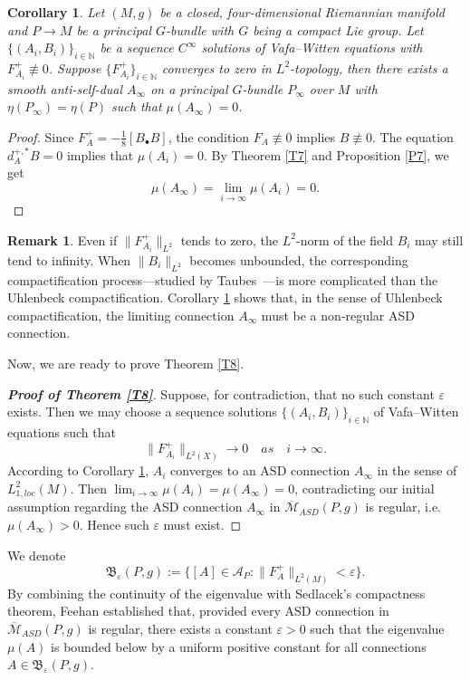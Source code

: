 \documentclass[12pt, twoside]{article}
\newtheorem{corollary}[theorem]{Corollary}
\theoremstyle{definition}
\newtheorem{remark}[theorem]{Remark}
\numberwithin{equation}{section}
\def \N {\mathbb{N}}
\begin{document}
\begin{corollary}\label{C3}
Let $(M,g)$ be a closed, four-dimensional Riemannian manifold and $P\rightarrow M$ be a principal $G$-bundle with $G$ being a compact Lie group. Let $\{(A_{i},B_{i})\}_{i\in\mathbb{N}}$ be a sequence $C^{\infty}$ solutions of Vafa--Witten equations with $F_{A_{i}}^{+}\not\equiv 0$. Suppose  $\{F^{+}_{A_{i}}\}_{i\in\N}$ converges to zero in $L^{2}$-topology, then there exists a smooth anti-self-dual $A_{\infty}$ on a principal $G$-bundle $P_{\infty}$ over $M$ with $\eta(P_{\infty})=\eta(P)$ such that $\mu(A_{\infty})=0$.
\end{corollary}
\begin{proof}
Since $F_{A}^{+}=-\frac{1}{8}[B_{\bullet} B]$, the condition $F_{A}\not\equiv0$ implies $B\not\equiv0$. 
The equation $d_{A}^{+,\ast}B=0$ implies that $\mu(A_{i})=0$. 
By Theorem \ref{T7} and Proposition \ref{P7}, we get $$\mu(A_{\infty})=\lim_{i\rightarrow\infty}\mu(A_{i})=0.$$
\end{proof}
\begin{remark}
Even if $\|F^{+}_{A_{i}}\|_{L^{2}}$ tends to zero, the $L^2$-norm of the field $B_{i}$ may still tend to infinity. When $\|B_{i}\|_{L^{2}}$ becomes unbounded, the corresponding compactification process---studied by Taubes~\cite{Tau17}---is more complicated than the Uhlenbeck compactification. Corollary \ref{C3} shows that, in the sense of Uhlenbeck compactification, the limiting connection $A_{\infty}$ must be a non‑regular ASD connection.
\end{remark}
Now, we are ready to prove Theorem \ref{T8}.
\begin{proof}[\textbf{Proof of Theorem \ref{T8}}]
Suppose, for contradiction, that no such constant $\varepsilon$ exists. 
Then we may choose a sequence solutions $\{(A_{i},B_{i})\}_{i\in\N}$ of Vafa--Witten equations such that 
$$\|F_{A_{i}}^{+}\|_{L^{2}(X)}\rightarrow 0\quad as \quad i\rightarrow\infty.$$ 
According to Corollary \ref{C3}, $A_{i}$ converges to an ASD connection $A_{\infty}$ in the sense of $L^{2}_{1,loc}(M)$.
 Then $\lim_{i\rightarrow\infty}\mu(A_{i})=\mu(A_{\infty})=0$,
  contradicting our initial assumption regarding the ASD connection $A_{\infty}$ in $\overline{\mathcal{M}}_{ASD}(P, g)$ is regular,
   i.e. $\mu(A_{\infty})>0$. Hence such $\varepsilon$ must exist.
\end{proof}

We denote 
$$\mathfrak{B}_{\varepsilon}(P,g):=\{[A]\in\mathcal{A}_{P} :\|F_{A}^{+}\|_{L^{2}(M)}<\varepsilon \}.$$
By combining the continuity of the eigenvalue with Sedlacek's compactness theorem, Feehan established that, provided every ASD connection in  $\overline{\mathcal{M}}_{ASD}(P, g)$ is regular, there exists a constant $\varepsilon>0$ such that the eigenvalue $\mu(A)$  is bounded below by a uniform positive constant for all connections $A\in\mathfrak{B}_{\varepsilon}(P,g)$.
\end{document}
